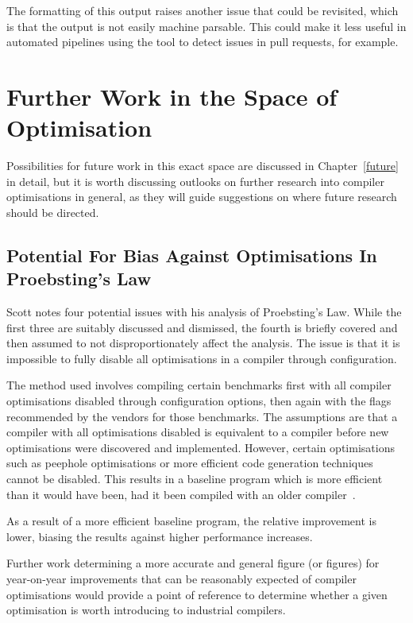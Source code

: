 

The formatting of this output raises another issue that could be revisited, which is that the output is not easily machine parsable. This could make it less useful in automated pipelines using the tool to detect issues in pull requests, for example.

\section{Further Work in the Space of Optimisation}


Possibilities for future work in this exact space are discussed in Chapter~\ref{future} in detail, but it is worth discussing outlooks on further research into compiler optimisations in general, as they will guide suggestions on where future research should be directed.

\subsection{Potential For Bias Against Optimisations In Proebsting's Law}

Scott notes four potential issues with his analysis of Proebsting's Law. While the first three are suitably discussed and dismissed, the fourth is briefly covered and then assumed to not disproportionately affect the analysis. The issue is that it is impossible to fully disable all optimisations in a compiler through configuration.

The method used involves compiling certain benchmarks first with all compiler optimisations disabled through configuration options, then again with the flags recommended by the vendors for those benchmarks. The assumptions are that a compiler with all optimisations disabled is equivalent to a compiler before new optimisations were discovered and implemented. However, certain optimisations such as peephole optimisations or more efficient code generation techniques cannot be disabled. This results in a baseline program which is more efficient than it would have been, had it been compiled with an older compiler~\cite{proebstingformal}.

As a result of a more efficient baseline program, the relative improvement is lower, biasing the results against higher performance increases.

Further work determining a more accurate and general figure (or figures) for year-on-year improvements that can be reasonably expected of compiler optimisations would provide a point of reference to determine whether a given optimisation is worth introducing to industrial compilers.

